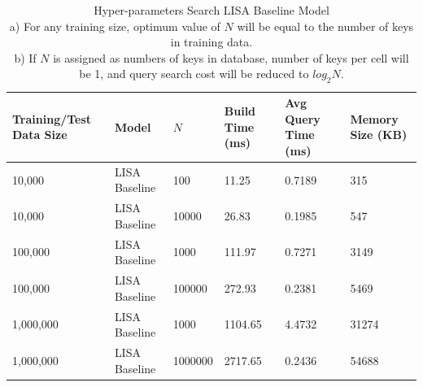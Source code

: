 \begin{table}
	\centering
	\begin{tabular}{||p{}<{\centering}|p{}<{\centering}| p{}<{\centering}|p{}<{\centering}|p{}<{\centering}|p{}<{\centering}||}
		\hline
		Training/Test Data Size& Model & $N$ & Build Time (ms) & Avg Query Time (ms) & Memory Size (KB)\\ [0.5ex] 
		\hline
		\hline
		10,000& LISA Baseline & 100 & 11.25 & 0.7189 & 315\\
		\hline
		10,000& LISA Baseline & 10000 &26.83 & 0.1985 & 547\\
		\hline
		100,000& LISA Baseline & 1000 & 111.97 & 0.7271 & 3149\\
		\hline
		100,000& LISA Baseline & 100000 & 272.93 & 0.2381 & 5469\\
		\hline
		1,000,000& LISA Baseline & 1000 & 1104.65 & 4.4732 & 31274\\
		\hline
		1,000,000& LISA Baseline & 1000000 & 2717.65 & 0.2436 & 54688\\
		\hline
		\hline
	\end{tabular}
    \caption{Hyper-parameters Search LISA Baseline Model\\
    a) For any training size, optimum value of $N$ will be equal to the number of keys in training data.\\
    b) If $N$ is assigned as numbers of keys in database, number of keys per cell will be 1, and query search cost will be reduced to $log_{2}N$.}
    \label{small_lognormal_lisa_baseline_10000}
\end{table}

